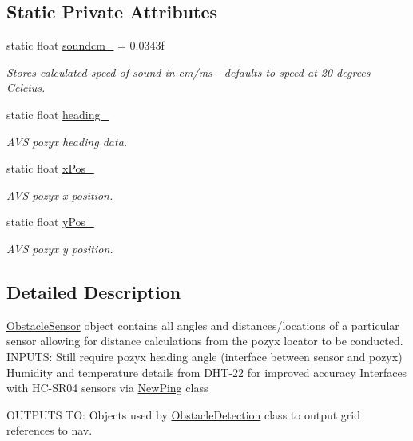 \subsection*{Static Private Attributes}
\begin{DoxyCompactItemize}
\item 
static float \mbox{\hyperlink{class_obstacle_sensor_ae6d0b250f37a34d04103d43e4e4e0082}{soundcm\+\_\+}} = 0.\+0343f
\begin{DoxyCompactList}\small\item\em Stores calculated speed of sound in cm/ms -\/ defaults to speed at 20 degrees Celcius. \end{DoxyCompactList}\item 
static float \mbox{\hyperlink{class_obstacle_sensor_add4a6ffaf43bcdd08e1a8c0c3956605d}{heading\+\_\+}}
\begin{DoxyCompactList}\small\item\em A\+VS pozyx heading data. \end{DoxyCompactList}\item 
static float \mbox{\hyperlink{class_obstacle_sensor_a108284bfc4bc3ded9aa47973a9d3a442}{x\+Pos\+\_\+}}
\begin{DoxyCompactList}\small\item\em A\+VS pozyx x position. \end{DoxyCompactList}\item 
static float \mbox{\hyperlink{class_obstacle_sensor_a5b34f3938826987d0b1623bb95e4220e}{y\+Pos\+\_\+}}
\begin{DoxyCompactList}\small\item\em A\+VS pozyx y position. \end{DoxyCompactList}\end{DoxyCompactItemize}


\subsection{Detailed Description}
\mbox{\hyperlink{class_obstacle_sensor}{Obstacle\+Sensor}} object contains all angles and distances/locations of a particular sensor allowing for distance calculations from the pozyx locator to be conducted. I\+N\+P\+U\+TS\+: Still require pozyx heading angle (interface between sensor and pozyx) Humidity and temperature details from D\+H\+T-\/22 for improved accuracy Interfaces with H\+C-\/\+S\+R04 sensors via \mbox{\hyperlink{class_new_ping}{New\+Ping}} class

O\+U\+T\+P\+U\+TS TO\+: Objects used by \mbox{\hyperlink{class_obstacle_detection}{Obstacle\+Detection}} class to output grid references to nav. 

